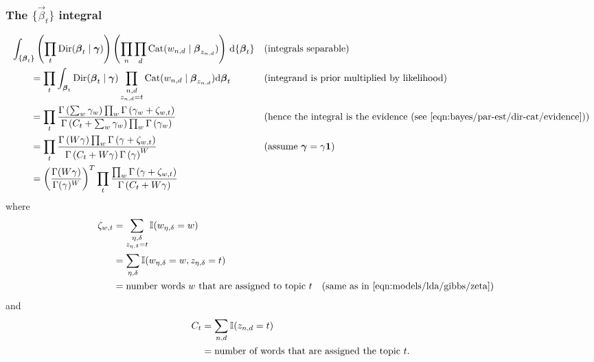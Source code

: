 \subsubsection{The $\{\vec \beta_t\}$ integral}
\label{sec:models/lda/collapsed-gibbs/beta-integral}
\begin{align}
    \hspace{2em}&\hspace{-2em}
    \int_{\{\vec \beta_t\}}
        \left(
            \prod_t \Dir(\vec \beta_t \given \vec \gamma)
        \right)
        \left(
            \prod_n \prod_d \Cat(w_{n, d} \given \vec \beta_{z_{n, d}})
        \right)
        \,\mathrm d\{\vec \beta_t\} &&\text{(integrals separable)}\nonumber\\
    &= \prod_t
        \int_{\vec \beta_t}
            \Dir(\vec \beta_t \given \vec \gamma)
            \prod_{\substack{n, d \\ z_{n, d} = t}} \Cat(w_{n, d} \given \vec \beta_{z_{n, d}})
        \mathrm d\vec \beta_t && \text{(integrand is prior multiplied by likelihood)}\nonumber\\
    &= \prod_t
        \frac
        {
            \Gamma\left(\sum_w \gamma_w\right) \prod_w \Gamma\left(\gamma_w + \zeta_{w, t}\right)
        }
        {
            \Gamma\left(C_t + \sum_w \gamma_w\right) \prod_w \Gamma\left(\gamma_w\right)
        } && \text{(hence the integral is the evidence (see \eqref{eqn:bayes/par-est/dir-cat/evidence}))} \nonumber\\
    &= \prod_t
        \frac
        {
            \Gamma\left(W\gamma\right) \prod_w \Gamma\left(\gamma + \zeta_{w, t}\right)
        }
        {
            \Gamma\left(C_t + W\gamma\right) \Gamma\left(\gamma\right)^W
        } && \text{(assume $\vec \gamma = \gamma \vec 1$)} \nonumber\\
    &=
        \left(
            \frac
            {
                \Gamma(W \gamma)
            }
            {
                \Gamma(\gamma)^W
            }
        \right)^T
        \prod_t
            \frac
            {
                \prod_w \Gamma\left(\gamma + \zeta_{w, t}\right)
            }
            {
                \Gamma\left(C_t + W\gamma\right)
            }
\end{align}
where
\begin{align}
    \zeta_{w, t}    &= \sum_{\substack{\eta, \delta \\ z_{\eta, \delta} = t}} \operatorname{\mathbb I}(w_{\eta, \delta} = w) \nonumber\\
                    &= \sum_{\eta, \delta} \operatorname{\mathbb I}(w_{\eta, \delta} = w, z_{\eta, \delta} = t) \\
                    &= \text{number words $w$ that are assigned to topic $t$} \nonumber && \text{(same as in \eqref{eqn:models/lda/gibbs/zeta})}
\end{align}
and
\begin{align}
    C_t     &= \sum_{n, d} \operatorname{\mathbb I}(z_{n, d} = t) \\
            &= \text{number of words that are assigned the topic $t$.} \nonumber
\end{align}